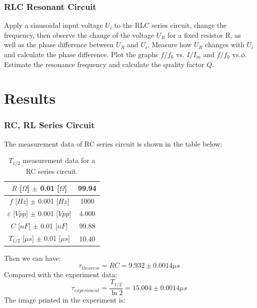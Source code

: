 \documentclass[12pt, a4paper]{article}
\begin{document}
\subsubsection{RLC Resonant Circuit}
Apply a sinusoidal input voltage $ U_i $ to the RLC series circuit, change the 
frequency, then observe the change of the voltage $ U_R $ for a fixed resistor R, 
as well as the phase difference between $ U_R $ and $ U_i $. Measure how $ U_R $ 
changes with $ U_i $ and calculate the phase difference. Plot the graphs 
$ f/f_0 $ vs. $ I/I_m $ and $ f/f_0 $ vs.$ \phi $. Estimate the resonance 
frequency and calculate the quality factor $ Q $.

\section{Results}
\subsubsection{RC, RL Series Circuit}
The measurement data of RC series circuit is shown in the table below:
\begin{table}[H]
	\begin{center}
	\begin{tabular}{|c|c|}
	\hline
	$R$ [$\Omega$] $\pm$ 0.01 [$\Omega$]	&	99.94	\\
	\hline
	$f$ [$Hz$] $\pm$ 0.001 [$Hz$]	&	1000	\\
	\hline
	$\varepsilon$ [$Vpp$] $\pm$ 0.001 [$Vpp$]	&	4.000	\\
	\hline
	$C$ [$nF$] $\pm$ 0.01 [$nF$]	&	99.88	\\
	\hline
	$T_{1/2}$ [$\mu s$] $\pm$ 0.01 [$\mu s$]	&	10.40	\\
	\hline
	\end{tabular}
	\caption{$T_{1/2}$ measurement data for a RC series circuit.}
	\label{tab-1}
	\end{center}
\end{table}
Then we can have:
$$\tau_{theorem} = RC = 9.932\pm0.0014\mu s$$ %
Compared with the experiment data:
$$\tau_{experiment} = \frac{T_{1/2}}{\ln2} = 15.004\pm0.0014\mu s$$ %
The image printed in the experiment is:
\end{document}
